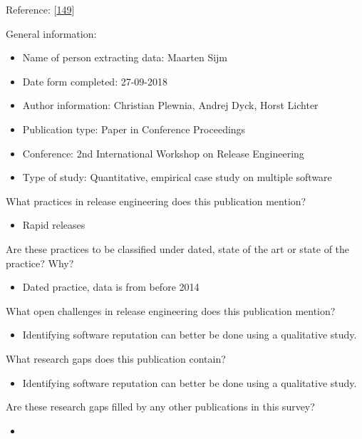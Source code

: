 \documentclass[]{book}
\providecommand{\tightlist}{%
  \setlength{\itemsep}{0pt}\setlength{\parskip}{0pt}}
\begin{document}
Reference: {[}\protect\hyperlink{ref-plewnia2014a}{149}{]}

General information:

\begin{itemize}
\tightlist
\item
  Name of person extracting data: Maarten Sijm
\item
  Date form completed: 27-09-2018
\item
  Author information: Christian Plewnia, Andrej Dyck, Horst Lichter
\item
  Publication type: Paper in Conference Proceedings
\item
  Conference: 2nd International Workshop on Release Engineering
\item
  Type of study: Quantitative, empirical case study on multiple software
\end{itemize}

What practices in release engineering does this publication mention?

\begin{itemize}
\tightlist
\item
  Rapid releases
\end{itemize}

Are these practices to be classified under dated, state of the art or
state of the practice? Why?

\begin{itemize}
\tightlist
\item
  Dated practice, data is from before 2014
\end{itemize}

What open challenges in release engineering does this publication
mention?

\begin{itemize}
\tightlist
\item
  Identifying software reputation can better be done using a qualitative
  study.
\end{itemize}

What research gaps does this publication contain?

\begin{itemize}
\tightlist
\item
  Identifying software reputation can better be done using a qualitative
  study.
\end{itemize}

Are these research gaps filled by any other publications in this survey?

\begin{itemize}
\item
\end{itemize}
\end{document}
